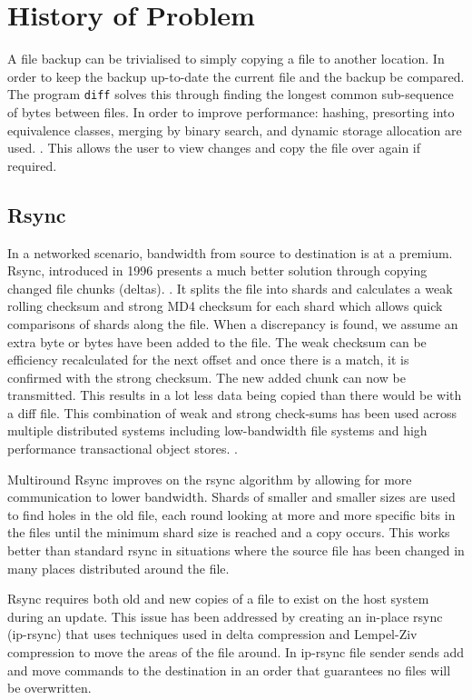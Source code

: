 \documentclass[11pt, a4paper, twocolumn, twoside]{report}
\def\code#1{\texttt{#1}}
\begin{document}
\section{History of Problem}

A file backup can be trivialised to simply copying a file to another location. In order to keep the backup up-to-date the current file and the backup be compared. The program \code{diff} solves this through finding the longest common sub-sequence of bytes between files. In order to improve performance: hashing, presorting into equivalence classes, merging by binary search, and dynamic storage allocation are used. \citep{hunt1976algorithm}. This allows the user to view changes and copy the file over again if required.

\subsection{Rsync}
In a networked scenario, bandwidth from source to destination is at a premium. Rsync, introduced in 1996 presents a much better solution through copying changed file chunks (deltas). \citep{tridgell1996rsync}. It splits the file into shards and calculates a weak rolling checksum and strong MD4 checksum for each shard which allows quick comparisons of shards along the file. When a discrepancy is found, we assume an extra byte or bytes have been added to the file. The weak checksum can be efficiency recalculated for the next offset and once there is a match, it is confirmed with the strong checksum. The new added chunk can now be transmitted. This results in a lot less data being copied than there would be with a diff file. \citep{tridgell1996rsync} This combination of weak and strong check-sums has been used across multiple distributed systems including low-bandwidth file systems \citep{muthitacharoen2001low} and high performance transactional object stores. \citep{stephen2000platypus}.

Multiround Rsync improves on the rsync algorithm by allowing for more communication to lower bandwidth. Shards of smaller and smaller sizes are used to find holes in the old file, each round looking at more and more specific bits in the files until the minimum shard size is reached and a copy occurs. \citep{multiroundrsync} This works better than standard rsync in situations where the source file has been changed in many places distributed around the file.

Rsync requires both old and new copies of a file to exist on the host system during an update. This issue has been addressed by creating an in-place rsync (ip-rsync) that uses techniques used in delta compression and Lempel-Ziv compression to move the areas of the file around. In ip-rsync file sender sends add and move commands to the destination in an order that guarantees no files will be overwritten. \citep{rasch2003place}
\end{document}
